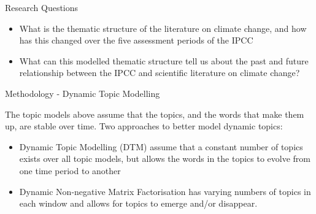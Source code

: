 \documentclass[9pt]{beamer}
\begin{document}

\begin{frame}{Research Questions}
\begin{itemize}
	\item What is the thematic structure of the literature on climate change, and how has this changed over the five assessment periods of the IPCC
	\item What can this modelled thematic structure tell us about the past and future relationship between the IPCC and scientific literature on climate change? 
\end{itemize}
\end{frame}


\begin{frame}{Methodology - Dynamic Topic Modelling}

The topic models above assume that the topics, and the words that make them up, are stable over time. Two approaches to better model dynamic topics:

\begin{itemize}
	\item<2->Dynamic Topic Modelling (DTM) \citep{Blei2006} assume that a constant number of topics exists over all topic models, but allows the words in the topics to evolve from one time period to another
	\item<3->Dynamic Non-negative Matrix Factorisation \citep{Greene2016} has varying numbers of topics in each window and allows for topics to emerge and/or disappear.
\end{itemize}


\end{frame}

\end{document}
